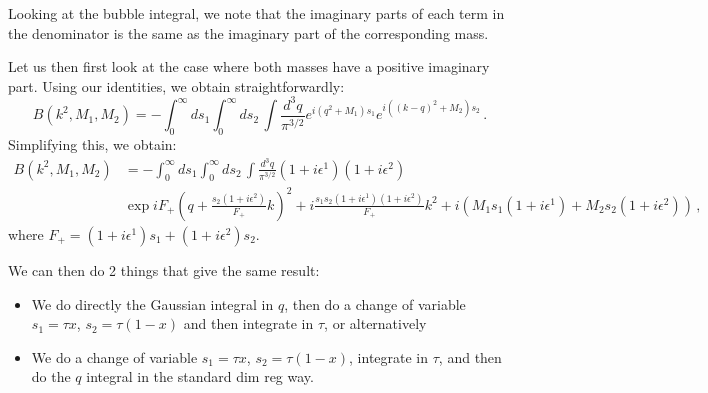 \documentclass[twoside]{article}
\begin{document}
Looking at the bubble integral, we note that the imaginary parts of each term in the denominator is the same as the imaginary part of the corresponding mass. 

Let us then first look at the case where both masses have a positive imaginary part. Using our identities, we obtain straightforwardly:
\begin{equation}
\label{eq:bubble}
B(k^2,M_1,M_2)= - \int_0^\infty ds_1 \int_0^\infty ds_2\,\int \frac{d^3q}{\pi^{3/2}} e^{i(q^2+M_1)s_1}e^{i((k-q)^2+M_2)s_2}\,.
\end{equation}
Simplifying this, we obtain:
\begin{equation}
\begin{split}
B(k^2,M_1,M_2)&= - \int_0^\infty ds_1 \int_0^\infty ds_2\,\int \frac{d^3q}{\pi^{3/2}} (1 + i\epsilon^1)(1 + i\epsilon^2)\\
&\exp{i F_+ (q+ \frac{s_2(1 + i\epsilon^2)}{F_+}k)^2+i\frac{s_1 s_2(1 + i\epsilon^1)(1 + i\epsilon^2)}{F_+}k^2+ i (M_1 s_1(1 + i\epsilon^1) +M_2 s_2(1 + i\epsilon^2))}\,,
\end{split}
\end{equation}
where $F_+= (1 + i\epsilon^1)s_1+(1 + i\epsilon^2)s_2$.

We can then do 2 things that give the same result:
\begin{itemize}
\item We do directly the Gaussian integral in $q$, then do a change of variable $s_1 = \tau x$, $s_2 = \tau (1-x)$ and then integrate in $\tau$, or alternatively
\item We do a change of variable $s_1 = \tau x$, $s_2 = \tau (1-x)$, integrate in $\tau$, and then do the $q$ integral in the standard dim reg way.
\end{itemize} 
\end{document}
